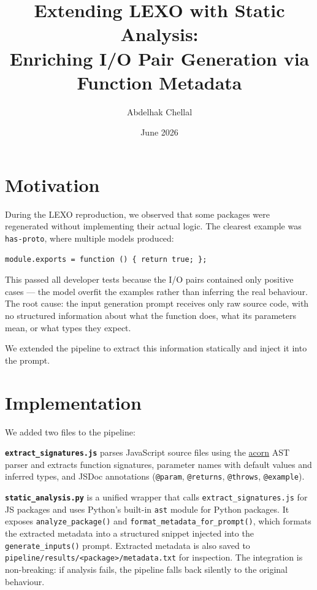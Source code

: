 \documentclass[11pt,a4paper]{article}
\title{\textbf{Extending LEXO with Static Analysis:\\Enriching I/O Pair Generation via Function Metadata}}
\author{Abdelhak Chellal}
\date{June 2026}
\begin{document}
\maketitle

\section{Motivation}

During the LEXO reproduction, we observed that some packages were regenerated without implementing their actual logic. The clearest example was \texttt{has-proto}, where multiple models produced:

\begin{verbatim}
module.exports = function () { return true; };
\end{verbatim}

This passed all developer tests because the I/O pairs contained only positive cases — the model overfit the examples rather than inferring the real behaviour. The root cause: the input generation prompt receives only raw source code, with no structured information about what the function does, what its parameters mean, or what types they expect.

We extended the pipeline to extract this information statically and inject it into the prompt.

\section{Implementation}

We added two files to the pipeline:

\textbf{\texttt{extract\_signatures.js}} parses JavaScript source files using the \href{https://github.com/acornjs/acorn}{acorn} AST parser and extracts function signatures, parameter names with default values and inferred types, and JSDoc annotations (\texttt{@param}, \texttt{@returns}, \texttt{@throws}, \texttt{@example}).

\textbf{\texttt{static\_analysis.py}} is a unified wrapper that calls \texttt{extract\_signatures.js} for JS packages and uses Python's built-in \texttt{ast} module for Python packages. It exposes \texttt{analyze\_package()} and \texttt{format\_metadata\_for\_prompt()}, which formats the extracted metadata into a structured snippet injected into the \texttt{generate\_inputs()} prompt. Extracted metadata is also saved to \texttt{pipeline/results/<package>/metadata.txt} for inspection. The integration is non-breaking: if analysis fails, the pipeline falls back silently to the original behaviour.
\end{document}
